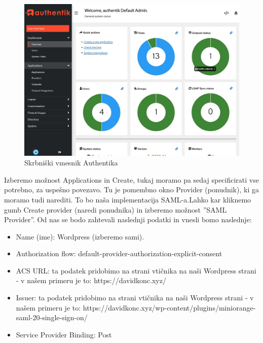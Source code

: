 \documentclass[a4paper,12pt,openright]{book}
\begin{document}
{\begin{figure}[H]
\hspace{-3cm}
\includegraphics[scale=0.55]{diploma-FRI-vzorec_11maj2021/admin_inter.jpg}
\caption{Skrbniški vmesnik Authentika}
\label{fig}
\end{figure}

Izberemo možnost Applications in Create, tukaj moramo pa sedaj specificirati vse potrebno, za uspešno povezavo. Tu je pomembno okno Provider (ponudnik), ki ga moramo tudi narediti. To bo naša implementacija SAML-a.Lahko kar kliknemo gumb Create provider (naredi ponudnika) in izberemo možnost ''SAML Provider''. 
Od nas se bodo zahtevali naslednji podatki in vnesli bomo naslednje:
\begin{itemize}
    \item Name (ime): Wordpress (izberemo sami).
    \item Authorization flow: default-provider-authorization-explicit-consent
    \item ACS URL: ta podatek pridobimo na strani vtičnika na naši Wordpress strani - v našem primeru je to: https://davidkonc.xyz/
    \item Issuer: ta podatek pridobimo na strani vtičnika na naši Wordpress strani - v našem primeru je to: https://davidkonc.xyz/wp-content/plugins/miniorange-saml-20-single-sign-on/
    \item Service Provider Binding:  Post
\end{itemize}

}
\end{document}
